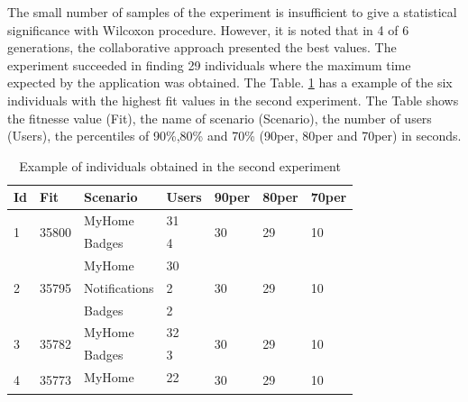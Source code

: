 The small number of samples of the experiment is insufficient to give a statistical significance with Wilcoxon procedure. However, it is noted that in 4 of 6 generations, the collaborative approach presented the best values. The experiment succeeded in finding 29 individuals where the maximum time expected by the application was obtained.  The Table. \ref{tab:secondexperiment1} has a example of the six individuals with the highest fit values in the second experiment. The Table shows the fitnesse value (Fit),  the name of scenario (Scenario), the number of users (Users), the percentiles of 90\%,80\% and 70\% (90per, 80per and 70per) in seconds.  

\begin{table}[h]
\centering
\caption{Example of individuals obtained in the second experiment}
\label{tab:secondexperiment1}
\begin{tabular}{|p{0.2cm}|l|l|l|p{0.60cm}|p{0.60cm}|p{0.60cm}|}
\hline
Id&Fit&Scenario&Users&90per&80per&70per\\ \hline
\multirow{2}{*}{1} & \multirow{2}{*}{35800} & MyHome        & 31              & \multirow{2}{*}{30} & \multirow{2}{*}{29} & \multirow{2}{*}{10} \\ \cline{3-4}
                   &                        & Badges        & 4               &                     &                     &                     \\ \hline
\multirow{3}{*}{2} & \multirow{3}{*}{35795} & MyHome        & 30              & \multirow{3}{*}{30} & \multirow{3}{*}{29} & \multirow{3}{*}{10} \\ \cline{3-4}
                   &                        & Notifications & 2               &                     &                     &                     \\ \cline{3-4}
                   &                        & Badges        & 2               &                     &                     &                     \\ \hline
\multirow{2}{*}{3} & \multirow{2}{*}{35782} & MyHome        & 32              & \multirow{2}{*}{30} & \multirow{2}{*}{29} & \multirow{2}{*}{10} \\ \cline{3-4}
                   &                        & Badges        & 3               &                     &                     &                     \\ \hline
\multirow{3}{*}{4} & \multirow{3}{*}{35773} & MyHome        & 22              & \multirow{3}{*}{30} & \multirow{3}{*}{29} & \multirow{3}{*}{10} \\ \cline{3-4}

\end{tabular}
\end{table}
